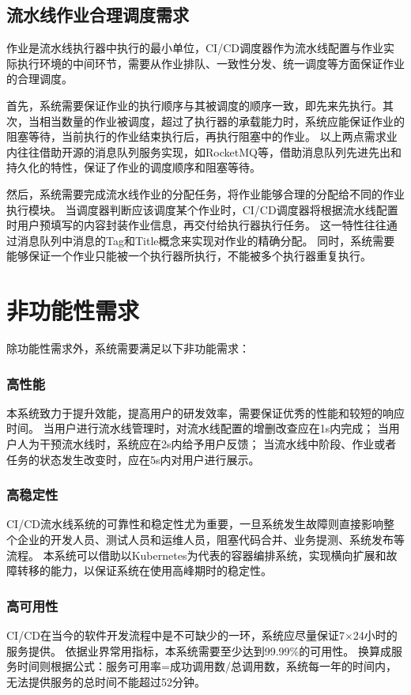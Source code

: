 \subsection{流水线作业合理调度需求}
\label{subsec:流水线作业合理调度需求}

作业是流水线执行器中执行的最小单位，CI/CD调度器作为流水线配置与作业实际执行环境的中间环节，需要从作业排队、一致性分发、统一调度等方面保证作业的合理调度。

首先，系统需要保证作业的执行顺序与其被调度的顺序一致，即先来先执行。其次，当相当数量的作业被调度，超过了执行器的承载能力时，系统应能保证作业的阻塞等待，当前执行的作业结束执行后，再执行阻塞中的作业。
以上两点需求业内往往借助开源的消息队列服务实现，如RocketMQ等，借助消息队列先进先出和持久化的特性，保证了作业的调度顺序和阻塞等待。

然后，系统需要完成流水线作业的分配任务，将作业能够合理的分配给不同的作业执行模块。
当调度器判断应该调度某个作业时，CI/CD调度器将根据流水线配置时用户预填写的内容封装作业信息，再交付给执行器执行任务。
这一特性往往通过消息队列中消息的Tag和Title概念来实现对作业的精确分配。
同时，系统需要能够保证一个作业只能被一个执行器所执行，不能被多个执行器重复执行。


\section{非功能性需求}

除功能性需求外，系统需要满足以下非功能需求：

\subsubsection{高性能}
本系统致力于提升效能，提高用户的研发效率，需要保证优秀的性能和较短的响应时间。
当用户进行流水线管理时，对流水线配置的增删改查应在1s内完成；
当用户人为干预流水线时，系统应在2s内给予用户反馈；
当流水线中阶段、作业或者任务的状态发生改变时，应在5s内对用户进行展示。

\subsubsection{高稳定性}
CI/CD流水线系统的可靠性和稳定性尤为重要，一旦系统发生故障则直接影响整个企业的开发人员、测试人员和运维人员，阻塞代码合并、业务提测、系统发布等流程。
本系统可以借助以Kubernetes为代表的容器编排系统，实现横向扩展和故障转移的能力，以保证系统在使用高峰期时的稳定性。

\subsubsection{高可用性}
CI/CD在当今的软件开发流程中是不可缺少的一环，系统应尽量保证7×24小时的服务提供。
依据业界常用指标，本系统需要至少达到99.99\%的可用性。
换算成服务时间则根据公式：服务可用率=成功调用数/总调用数，系统每一年的时间内，无法提供服务的总时间不能超过52分钟。

